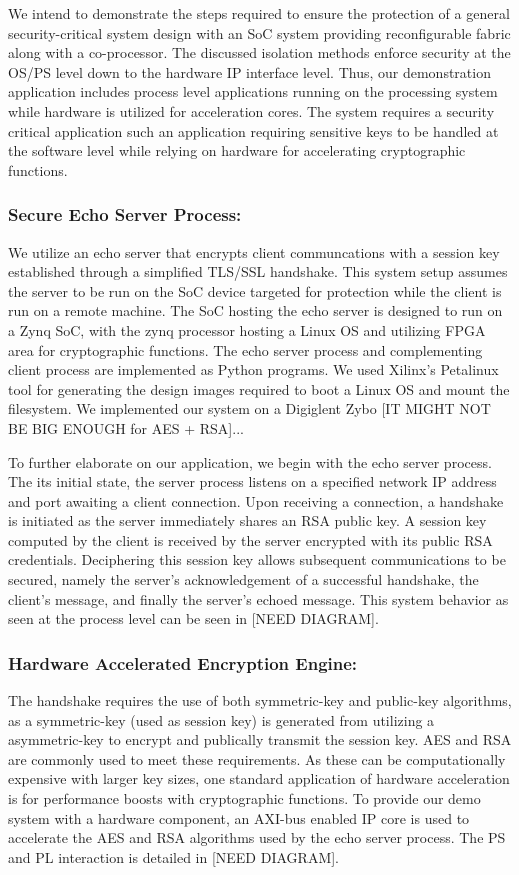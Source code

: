 \documentclass[sigconf]{acmart}
\theoremstyle{plain}
\theoremstyle{remark}
\begin{document}
We intend to demonstrate the steps required to ensure the protection of a general security-critical system design with an SoC system providing reconfigurable fabric along with a co-processor. The discussed isolation methods enforce security at the OS/PS level down to the hardware IP interface level. Thus, our demonstration application includes process level applications running on the processing system while hardware is utilized for acceleration cores. The system requires a security critical application such an application requiring sensitive keys to be handled at the software level while relying on hardware for accelerating cryptographic functions.

\subsubsection{Secure Echo Server Process:}
We utilize an echo server that encrypts client communcations with a session key established through a simplified TLS/SSL handshake. This system setup assumes the server to be run on the SoC device targeted for protection while the client is run on a remote machine. The SoC hosting the echo server is designed to run on a Zynq SoC, with the zynq processor hosting a Linux OS and utilizing FPGA area for cryptographic functions. The echo server process and complementing client process are implemented as Python programs. We used Xilinx's Petalinux tool for generating the design images required to boot a Linux OS and mount the filesystem. We implemented our system on a Digiglent Zybo [IT MIGHT NOT BE BIG ENOUGH for AES + RSA]...

To further elaborate on our application, we begin with the echo server process. The its initial state, the server process listens on a specified network IP address and port awaiting a client connection. Upon receiving a connection, a handshake is initiated as the server immediately shares an RSA public key. A session key computed by the client is received by the server encrypted with its public RSA credentials. Deciphering this session key allows subsequent communications to be secured, namely the server's acknowledgement of a successful handshake, the client's message, and finally the server's echoed message. This system behavior as seen at the process level can be seen in [NEED DIAGRAM].

\subsubsection{Hardware Accelerated Encryption Engine:}
The handshake requires the use of both symmetric-key and public-key algorithms, as a symmetric-key (used as session key) is generated from utilizing a asymmetric-key to encrypt and publically transmit the session key. AES and RSA are commonly used to meet these requirements. As these can be computationally expensive with larger key sizes, one standard application of hardware acceleration is for performance boosts with cryptographic functions. To provide our demo system with a hardware component, an AXI-bus enabled IP core is used to accelerate the AES and RSA algorithms used by the echo server process. The PS and PL interaction is detailed in [NEED DIAGRAM].
\end{document}
